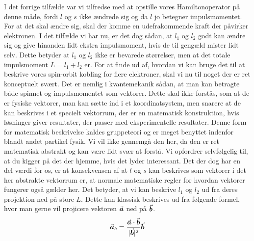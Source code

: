\documentclass[../../Atom-ogMolekylefysik.tex]{subfiles}
\begin{document}
I det forrige tilfælde var vi tilfredse med at opstille vores Hamiltonoperator på denne måde, fordi $l$ og $s$ ikke ændrede sig og da $l$ jo betegner impulsmomentet. For at det skal ændre sig, skal der komme en udefrakommende kraft der påvirker elektronen. I det tilfælde vi har nu, er det dog sådan, at $l_1$ og $l_2$ godt kan ændre sig og give hinanden lidt ekstra impulsmoment, hvis de til gengæld mister lidt selv. Dette betyder at $l_1$ og $l_2$ ikke er bevarede størrelser, men at det totale impulsmoment $L=l_1+l_2$ er. For at finde ud af, hvordan vi kan bruge det til at beskrive vores spin-orbit kobling for flere elektroner, skal vi nu til noget der er ret konceptuelt svært. Det er nemlig i kvantemekanik sådan, at man kan betragte både spinnet og impulsmomentet som vektorer. Dette skal ikke forstås, som at de er fysiske vektorer, man kan sætte ind i et koordinatsystem, men snarere at de kan beskrives i et specielt vektorrum, der er en matematisk konstruktion, hvis løsninger giver resultater, der passer med eksperimentelle resultater. Denne form for matematisk beskrivelse kaldes gruppeteori og er meget benyttet indenfor blandt andet partikel fysik. Vi vil ikke gennemgå den her, da den er ret matematisk abstrakt og kan være lidt svær at forstå. Vi opfordrer selvfølgelig til, at du kigger på det der hjemme, hvis det lyder interessant.
Det der dog har en del værdi for os, er at konsekvensen af at $l$ og $s$ kan beskrives som vektorer i det her abstrakte vektorrum er, at normale matematiske regler for hvordan vektorer fungerer også gælder her. Det betyder, at vi kan beskrive $l_1$ og $l_2$ ud fra deres projektion ned på store $L$. 
Dette kan klassisk beskrives ud fra følgende formel, hvor man gerne vil projicere vektoren ${\vec{\boldsymbol{a}}}$ ned på ${\vec{\boldsymbol{b}}}$.
\begin{equation}
    {\vec{\boldsymbol{a}}}_b = \frac{{\vec{\boldsymbol{a}}}\cdot {\vec{\boldsymbol{b}}}}{|{{\vec{\boldsymbol{b}}}}|^2}{\vec{\boldsymbol{b}}}
\end{equation}
\end{document}
